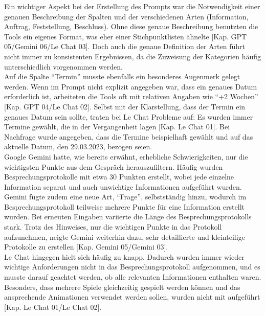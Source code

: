 Ein wichtiger Aspekt bei der Erstellung des Prompts war die Notwendigkeit einer genauen Beschreibung der Spalten und der verschiedenen 
Arten (Information, Auftrag, Feststellung, Beschluss). Ohne diese genaue Beschreibung benutzten die Tools ein eigenes Format, was eher  
einer Stichpunktlisten ähnelte [Kap. GPT 05/Gemini 06/Le Chat 03]. Doch auch die genaue Definition der Arten führt nicht immer 
zu konsistenten Ergebnissen, da die Zuweisung der Kategorien häufig unterschiedlich vorgenommen werden.\\

Auf die Spalte ``Termin'' musste ebenfalls ein besonderes Augenmerk gelegt werden. Wenn im Prompt nicht explizit angegeben war, dass ein 
genaues Datum erforderlich ist, arbeiteten die Tools oft mit relativen Angaben wie ``+2 Wochen'' [Kap. GPT 04/Le Chat 02]. Selbst mit der Klarstellung, dass der 
Termin ein genaues Datum sein sollte, traten bei Le Chat Probleme auf: Es wurden immer Termine gewählt, die in der Vergangenheit lagen [Kap. Le Chat 01]. 
Bei Nachfrage wurde angegeben, dass die Termine beispielhaft gewählt und auf das aktuelle Datum, den 29.03.2023, bezogen seien.\\

Google Gemini hatte, wie bereits erwähnt, erhebliche Schwierigkeiten, nur die wichtigsten Punkte aus dem Gespräch herauszufiltern. 
Häufig wurden Besprechungsprotokolle mit etwa 30 Punkten erstellt, wobei jede einzelne Information separat und auch unwichtige 
Informationen aufgeführt wurden. Gemini fügte zudem eine neue Art, ``Frage'', selbstständig hinzu, wodurch im Besprechungsprotokoll 
teilweise mehrere Punkte für eine Information erstellt wurden. Bei erneuten Eingaben variierte die Länge des Besprechungsprotokolls 
stark. Trotz des Hinweises, nur die wichtigen Punkte in das Protokoll aufzunehmen, neigte Gemini weiterhin dazu, sehr detaillierte und 
kleinteilige Protokolle zu erstellen [Kap. Gemini 05/Gemini 03].\\

Le Chat hingegen hielt sich häufig zu knapp. Dadurch wurden immer wieder wichtige Anforderungen nicht in das Besprechungsprotokoll 
aufgenommen, und es musste darauf geachtet werden, ob alle relevanten Informationen enthalten waren. Besonders, dass mehrere
Spiele gleichzeitig gespielt werden können und das ansprechende Animationen verwendet werden sollen, wurden nicht mit aufgeführt
[Kap. Le Chat 01/Le Chat 02].\\

